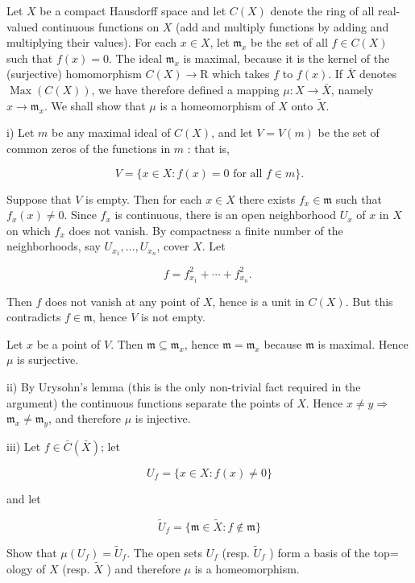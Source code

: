 \documentclass{standalone}
\theoremstyle{definition}
\theoremstyle{remark}
\begin{document}
Let $X$ be a compact Hausdorff space and let $C(X)$ denote the ring of all real-valued continuous functions on $X$ (add and multiply functions by adding and multiplying their values). For each $x \in X$, let $\mathfrak{m}_{x}$ be the set of all $f \in C(X)$ such that $f(x)=0$. The ideal $\mathfrak{m}_{x}$ is maximal, because it is the kernel of the (surjective) homomorphism $C(X) \rightarrow \mathrm{R}$ which takes $f$ to $f(x)$. If $\bar{X}$ denotes $\operatorname{Max}(C(X))$, we have therefore defined a mapping $\mu: X \rightarrow \bar{X}$, namely $x \rightarrow \mathfrak{m}_{x}$. We shall show that $\mu$ is a homeomorphism of $X$ onto $\tilde{X}$.

i) Let $m$ be any maximal ideal of $C(X)$, and let $V=V(m)$ be the set of common zeros of the functions in $m$ : that is,

\[
V=\{x \in X: f(x)=0 \text { for all } f \in m\} .
\]

Suppose that $V$ is empty. Then for each $x \in X$ there exists $f_{x} \in \mathfrak{m}$ such that $f_{x}(x) \neq 0$. Since $f_{x}$ is continuous, there is an open neighborhood $U_{x}$ of $x$ in $X$ on which $f_{x}$ does not vanish. By compactness a finite number of the neighborhoods, say $U_{x_{1}}, \ldots, U_{x_{n}}$, cover $X$. Let

\[
f=f_{x_{1}}^{2}+\cdots+f_{x_{n}}^{2} \text {. }
\]

Then $f$ does not vanish at any point of $X$, hence is a unit in $C(X)$. But this contradicts $f \in \mathfrak{m}$, hence $V$ is not empty.

Let $x$ be a point of $V$. Then $\mathfrak{m} \subseteq \mathfrak{m}_{x}$, hence $\mathfrak{m}=\mathfrak{m}_{x}$ because $\mathfrak{m}$ is maximal. Hence $\mu$ is surjective.

ii) By Urysohn's lemma (this is the only non-trivial fact required in the argument) the continuous functions separate the points of $X$. Hence $x \neq y \Rightarrow$ $\mathfrak{m}_{x} \neq \mathfrak{m}_{y}$, and therefore $\mu$ is injective.

iii) Let $f \in \bar{C}(\bar{X})$; let

\[
U_{f}=\{x \in X: f(x) \neq 0\}
\]

and let

\[
\tilde{U}_{f}=\{\mathfrak{m} \in \tilde{X}: f \notin \mathfrak{m}\}
\]

Show that $\mu\left(U_{f}\right)=\tilde{U}_{f}$. The open sets $U_{f}$ (resp. $\tilde{U}_{f}$ ) form a basis of the top= ology of $X$ (resp. $\tilde{X}$ ) and therefore $\mu$ is a homeomorphism.
\end{document}
